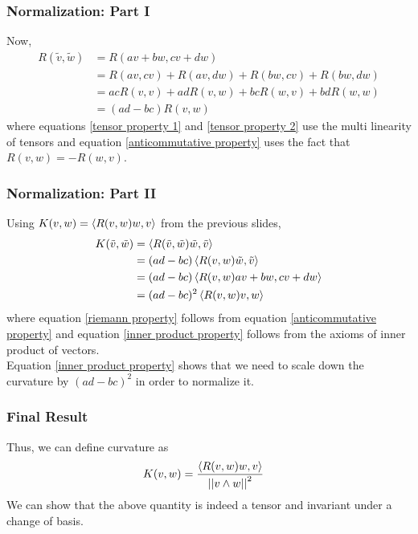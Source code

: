 \begin{frame}
\frametitle{Normalization: Part I}
Now,
\begin{align}
R(\tilde{v},\tilde{w})&=R(av+bw,cv+dw)\\
\label{tensor property 1}
&=R(av,cv)+R(av,dw)+R(bw,cv)+R(bw,dw)\\
\label{tensor property 2}
&=acR(v,v)+adR(v,w)+bcR(w,v)+bdR(w,w)\\
\label{anticommutative property}
&=(ad-bc)R(v,w)
\end{align}
where equations \ref{tensor property 1} and \ref{tensor property 2} use the multi linearity of tensors and equation \ref{anticommutative property} uses the fact that $R(v,w)=-R(w,v)$.
\end{frame}

\begin{frame}
\frametitle{Normalization: Part II}
Using $K(v,w)=\left\langle R(v,w) w, v \right\rangle$ from the previous slides, 
\begin{align}
K(\tilde{v},\tilde{w})&=\left\langle R(\tilde{v},\tilde{w}) \tilde{w}, \tilde{v} \right\rangle\\
\label{riemann property}
&=(ad-bc)\left\langle R(v,w) \tilde{w}, \tilde{v} \right\rangle\\
&=(ad-bc)\left\langle R(v,w) av+bw, cv+dw \right\rangle\\
\label{inner product property}
&=(ad-bc)^2\left\langle R(v,w) v, w \right\rangle
\end{align}
where equation \ref{riemann property} follows from equation \ref{anticommutative property} and equation \ref{inner product property} follows from the axioms of inner product of vectors.\\
\pause
Equation \ref{inner product property} shows that we need to scale down the curvature by $(ad-bc)^2$ in order to normalize it. 
\end{frame}

\begin{frame}
\frametitle{Final Result}
Thus, we can define curvature as
\begin{align}
\label{final result}
K(v,w)&=\frac{\left\langle R(v,w) w, v \right\rangle}{\left\lvert\left\lvert v\wedge w \right\rvert\right\rvert^2}
\end{align}
We can show that the above quantity is indeed a tensor and invariant under a change of basis.
\end{frame}
